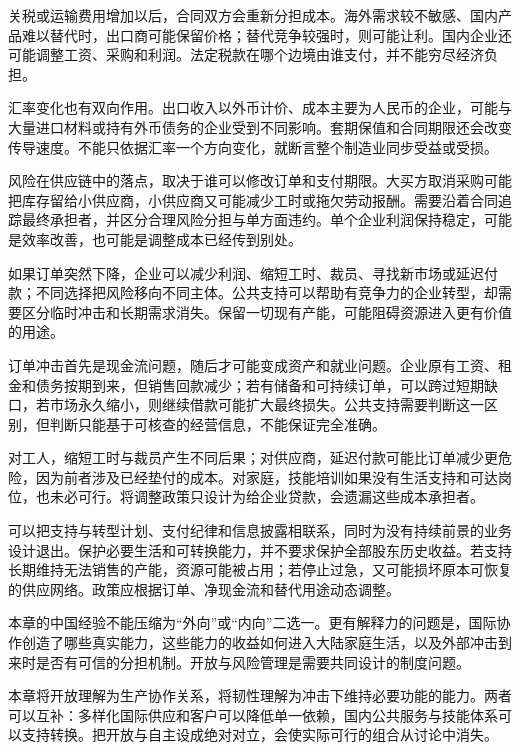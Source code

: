 \documentclass[UTF8,fontset=fandol,zihao=-4,oneside,openany]{ctexbook}
\begin{document}
\label{arg:P220}
关税或运输费用增加以后，合同双方会重新分担成本。海外需求较不敏感、国内产品难以替代时，出口商可能保留价格；替代竞争较强时，则可能让利。国内企业还可能调整工资、采购和利润。法定税款在哪个边境由谁支付，并不能穷尽经济负担。

汇率变化也有双向作用。出口收入以外币计价、成本主要为人民币的企业，可能与大量进口材料或持有外币债务的企业受到不同影响。套期保值和合同期限还会改变传导速度。不能只依据汇率一个方向变化，就断言整个制造业同步受益或受损。

风险在供应链中的落点，取决于谁可以修改订单和支付期限。大买方取消采购可能把库存留给小供应商，小供应商又可能减少工时或拖欠劳动报酬。需要沿着合同追踪最终承担者，并区分合理风险分担与单方面违约。单个企业利润保持稳定，可能是效率改善，也可能是调整成本已经传到别处。

如果订单突然下降，企业可以减少利润、缩短工时、裁员、寻找新市场或延迟付款；不同选择把风险移向不同主体。公共支持可以帮助有竞争力的企业转型，却需要区分临时冲击和长期需求消失。保留一切现有产能，可能阻碍资源进入更有价值的用途。

\label{arg:P221}
订单冲击首先是现金流问题，随后才可能变成资产和就业问题。企业原有工资、租金和债务按期到来，但销售回款减少；若有储备和可持续订单，可以跨过短期缺口，若市场永久缩小，则继续借款可能扩大最终损失。公共支持需要判断这一区别，但判断只能基于可核查的经营信息，不能保证完全准确。

对工人，缩短工时与裁员产生不同后果；对供应商，延迟付款可能比订单减少更危险，因为前者涉及已经垫付的成本。对家庭，技能培训如果没有生活支持和可达岗位，也未必可行。将调整政策只设计为给企业贷款，会遗漏这些成本承担者。

可以把支持与转型计划、支付纪律和信息披露相联系，同时为没有持续前景的业务设计退出。保护必要生活和可转换能力，并不要求保护全部股东历史收益。若支持长期维持无法销售的产能，资源可能被占用；若停止过急，又可能损坏原本可恢复的供应网络。政策应根据订单、净现金流和替代用途动态调整。

本章的中国经验不能压缩为“外向”或“内向”二选一。更有解释力的问题是，国际协作创造了哪些真实能力，这些能力的收益如何进入大陆家庭生活，以及外部冲击到来时是否有可信的分担机制。开放与风险管理是需要共同设计的制度问题。

\label{arg:P222}
本章将开放理解为生产协作关系，将韧性理解为冲击下维持必要功能的能力。两者可以互补：多样化国际供应和客户可以降低单一依赖，国内公共服务与技能体系可以支持转换。把开放与自主设成绝对对立，会使实际可行的组合从讨论中消失。
\end{document}
